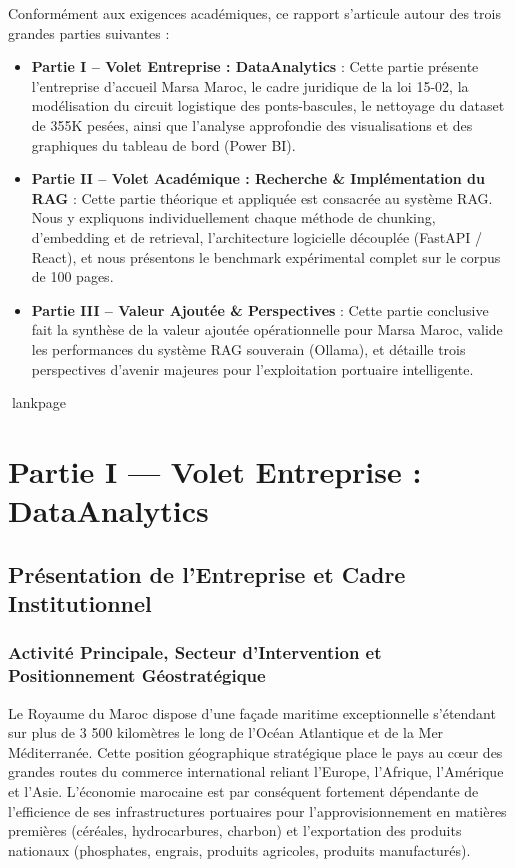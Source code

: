 \documentclass[12pt,a4paper,oneside]{report}
\newcommand{\blankpage}{%
  \newpage
  \thispagestyle{empty}%
  \mbox{}%
  \newpage
}
\begin{document}
Conformément aux exigences académiques, ce rapport s'articule autour des trois grandes parties suivantes :
\begin{itemize}
    \item \textbf{Partie I – Volet Entreprise : DataAnalytics} : Cette partie présente l'entreprise d'accueil Marsa Maroc, le cadre juridique de la loi 15-02, la modélisation du circuit logistique des ponts-bascules, le nettoyage du dataset de 355K pesées, ainsi que l'analyse approfondie des visualisations et des graphiques du tableau de bord (Power BI).
    \item \textbf{Partie II – Volet Académique : Recherche \& Implémentation du RAG} : Cette partie théorique et appliquée est consacrée au système RAG. Nous y expliquons individuellement chaque méthode de chunking, d'embedding et de retrieval, l'architecture logicielle découplée (FastAPI / React), et nous présentons le benchmark expérimental complet sur le corpus de 100 pages.
    \item \textbf{Partie III – Valeur Ajoutée \& Perspectives} : Cette partie conclusive fait la synthèse de la valeur ajoutée opérationnelle pour Marsa Maroc, valide les performances du système RAG souverain (Ollama), et détaille trois perspectives d'avenir majeures pour l'exploitation portuaire intelligente.
\end{itemize}

lankpage
\blankpage

\chapter{Partie I — Volet Entreprise : DataAnalytics}

\section{Présentation de l'Entreprise et Cadre Institutionnel}

\subsection{Activité Principale, Secteur d'Intervention et Positionnement Géostratégique}
Le Royaume du Maroc dispose d'une façade maritime exceptionnelle s'étendant sur plus de 3 500 kilomètres le long de l'Océan Atlantique et de la Mer Méditerranée. Cette position géographique stratégique place le pays au cœur des grandes routes du commerce international reliant l'Europe, l'Afrique, l'Amérique et l'Asie. L'économie marocaine est par conséquent fortement dépendante de l'efficience de ses infrastructures portuaires pour l'approvisionnement en matières premières (céréales, hydrocarbures, charbon) et l'exportation des produits nationaux (phosphates, engrais, produits agricoles, produits manufacturés).
\end{document}
